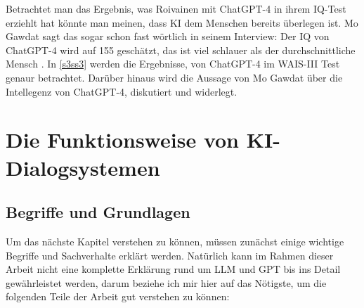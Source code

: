 	Betrachtet man das Ergebnis, was Roivainen mit ChatGPT-4 in ihrem IQ-Test erziehlt hat könnte man meinen,
	dass KI dem Menschen bereits überlegen ist. Mo Gawdat sagt das sogar schon fast wörtlich in seinem Interview:
	\glqq{}Der IQ von ChatGPT-4 wird auf 155 geschätzt, das ist viel schlauer als der durchschnittliche Mensch\grqq{} 
	\cite{gawdat23}. In \ref{s3ss3} werden die Ergebnisse, von ChatGPT-4 im WAIS-III Test genaur betrachtet.
	Darüber hinaus wird die Aussage von Mo Gawdat über die Intellegenz von ChatGPT-4, diskutiert und widerlegt. 	

\clearpage	
\section{Die Funktionsweise von KI-Dialogsystemen}
	\subsection{Begriffe und Grundlagen}\label{s2ss1}
	Um das nächste Kapitel verstehen zu können, müssen zunächst einige wichtige Begriffe und Sachverhalte erklärt 
	werden. Natürlich kann im Rahmen dieser Arbeit nicht eine komplette Erklärung rund um LLM und GPT bis ins Detail
	gewährleistet werden, darum beziehe ich mir hier auf das Nötigste, um die folgenden Teile der Arbeit gut verstehen
	zu können: 
	
